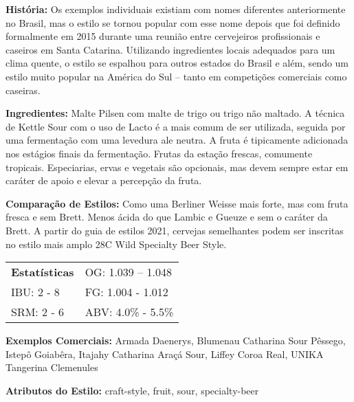 \textbf{História:} Os exemplos individuais existiam com nomes diferentes anteriormente no Brasil, mas o estilo se tornou popular com esse nome depois que foi definido formalmente em 2015 durante uma reunião entre cervejeiros profissionais e caseiros em Santa Catarina. Utilizando ingredientes locais adequados para um clima quente, o estilo se espalhou para outros estados do Brasil e além, sendo um estilo muito popular na América do Sul – tanto em competições comerciais como caseiras.

\textbf{Ingredientes:} Malte Pilsen com malte de trigo ou trigo não maltado. A técnica de Kettle Sour com o uso de Lacto é a mais comum de ser utilizada, seguida por uma fermentação com uma levedura ale neutra. A fruta é tipicamente adicionada nos estágios finais da fermentação. Frutas da estação frescas, comumente tropicais. Especiarias, ervas e vegetais são opcionais, mas devem sempre estar em caráter de apoio e elevar a percepção da fruta.

\textbf{Comparação de Estilos:} Como uma Berliner Weisse mais forte, mas com fruta fresca e sem Brett. Menos ácida do que Lambic e Gueuze e sem o caráter da Brett. A partir do guia de estilos 2021, cervejas semelhantes podem ser inscritas no estilo mais amplo 28C Wild Specialty Beer Style.

\begin{tabular}{@{}p{35mm}p{35mm}@{}}
  \textbf{Estatísticas} & OG: 1.039 – 1.048\\
  IBU: 2 - 8 & FG: 1.004 - 1.012 \\
  SRM: 2 - 6  & ABV: 4.0\% - 5.5\%
\end{tabular}

\textbf{Exemplos Comerciais:} Armada Daenerys, Blumenau Catharina Sour Pêssego, Istepô Goiabêra, Itajahy Catharina Araçá Sour, Liffey Coroa Real, UNIKA Tangerina Clemenules

\textbf{Atributos do Estilo:} craft-style, fruit, sour, specialty-beer
